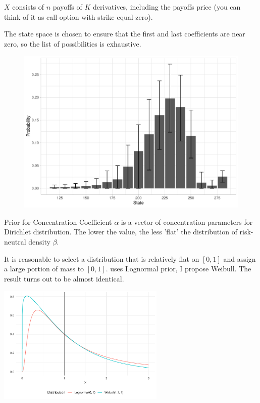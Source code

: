 \documentclass[10pt,aspectratio=43]{beamer}
\begin{document}
\begin{frame}{}
$X$ consists of $n$ payoffs of $K$ derivatives, including the payoffs price (you can think of it as call option with strike equal zero).

The state space is chosen to ensure that the first and last coefficients are near zero, so the list of possibilities is exhaustive.
 \begin{figure}\centering
    \begin{minipage}{0.6\linewidth}
        \centering
                \includegraphics[width=\linewidth]{betas_23_3.pdf}
    \end{minipage}
    \end{figure}

\end{frame}

\begin{frame}{Prior for Concentration Coefficient}
    $\alpha$ is a vector of concentration parameters for Dirichlet distribution. The lower the value, the less 'flat' the distribution of risk-neutral density $\beta$.
    
    It is reasonable to select a distribution that is relatively flat on $[0,1]$ and assign a large portion of mass to $[0,1]$. \cite{fisherSimplexRegression2016} uses Lognormal prior, I propose Weibull. The result turns out to be almost identical.

    \includegraphics[width=0.6\textwidth]{prior_difference.pdf}

\end{frame}
\end{document}
